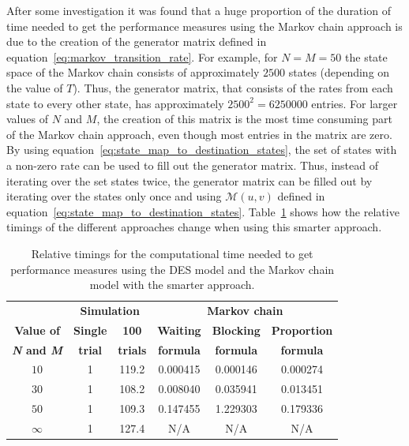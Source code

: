 After some investigation it was found that a huge proportion of the duration of
time needed to get the performance measures using the Markov chain approach is
due to the creation of the generator matrix defined in
equation~\eqref{eq:markov_transition_rate}.
For example, for \(N = M = 50\) the state space of the Markov chain consists
of approximately \(2500\) states (depending on the value of \(T\)).
Thus, the generator matrix, that consists of the rates from each state to every
other state, has approximately \(2500^2 = 6250000\) entries.
For larger values of \(N\) and \(M\), the creation of this matrix is the most
time consuming part of the Markov chain approach, even though most entries in
the matrix are zero.
By using equation~\eqref{eq:state_map_to_destination_states}, the set of states
with a non-zero rate can be used to fill out the generator matrix.
Thus, instead of iterating over the set states twice, the generator matrix can
be filled out by iterating over the states only once and using
\(\mathcal{M}(u,v)\) defined in
equation~\eqref{eq:state_map_to_destination_states}.
Table~\ref{tab:truncation_effect_timings_new} shows how the relative timings
of the different approaches change when using this smarter approach.


\tiny
\begin{table}[H]
    \centering
    \caption{Relative timings for the computational time needed to get
    performance measures using the DES model and the Markov chain model with
    the smarter approach.}
    \begin{tabular}{c|cc|ccc}
        & \multicolumn{2}{c}{\textbf{Simulation}} &
        \multicolumn{3}{c}{\textbf{Markov chain}} \\
        \textbf{Value of} & \textbf{Single} & \textbf{100} &
        \textbf{Waiting} & \textbf{Blocking} &
        \textbf{Proportion} \\
        \textbf{\textit{N} and \textit{M}} & \textbf{trial} & \textbf{trials} &
        \textbf{formula} & \textbf{formula} & \textbf{formula} \\
        \hline
        \(10\) & 1 & 119.2 & 0.000415 & 0.000146 & 0.000274 \\
        \hline
        \(30\) & 1 & 108.2 & 0.008040 & 0.035941 & 0.013451 \\
        \hline
        \(50\) & 1 & 109.3 & 0.147455 & 1.229303 & 0.179336 \\
        \hline
        \(\infty\) & 1 & 127.4 & N/A & N/A & N/A \\
    \end{tabular}
    \label{tab:truncation_effect_timings_new}
\end{table}
\normalsize

